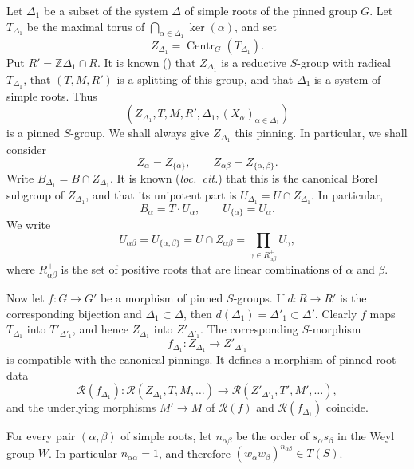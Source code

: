 
Let \(\Delta_1\) be a subset of the system \(\Delta\) of simple roots
of the pinned group \(G\). Let \(T_{\Delta_1}\) be the maximal torus
of \(\bigcap_{\alpha\in\Delta_1}\ker(\alpha)\), and set
\[
  Z_{\Delta_1}=\operatorname{Centr}_G(T_{\Delta_1}).
\]
Put \(R'=\mathbb Z\Delta_1\cap R\). It is known
() that \(Z_{\Delta_1}\) is a reductive \(S\)-group
with radical \(T_{\Delta_1}\), that \((T,M,R')\) is a splitting of
this group, and that \(\Delta_1\) is a system of simple roots. Thus
\[
  (Z_{\Delta_1},T,M,R',\Delta_1,(X_\alpha)_{\alpha\in\Delta_1})
\]
is a pinned \(S\)-group. We shall always give \(Z_{\Delta_1}\) this
pinning. In particular, we shall consider
\[
  Z_\alpha=Z_{\{\alpha\}},\qquad
  Z_{\alpha\beta}=Z_{\{\alpha,\beta\}}.
\]
Write \(B_{\Delta_1}=B\cap Z_{\Delta_1}\). It is known
(\textit{loc.\ cit.}) that this is the canonical Borel subgroup
of \(Z_{\Delta_1}\), and that its unipotent part is
\(U_{\Delta_1}=U\cap Z_{\Delta_1}\). In particular,
\[
  B_\alpha=T\cdot U_\alpha,\qquad U_{\{\alpha\}}=U_\alpha.
\]
We write
\[
  U_{\alpha\beta}=U_{\{\alpha,\beta\}}
  =U\cap Z_{\alpha\beta}
  =\prod_{\gamma\in R_{\alpha\beta}^{+}}U_\gamma,
\]
where \(R_{\alpha\beta}^{+}\) is the set of positive roots that are
linear combinations of \(\alpha\) and \(\beta\).

Now let \(f:G\to G'\) be a morphism of pinned \(S\)-groups. If
\(d:R\to R'\) is the corresponding bijection and
\(\Delta_1\subset\Delta\), then
\(d(\Delta_1)=\Delta'_1\subset\Delta'\). Clearly \(f\) maps
\(T_{\Delta_1}\) into \(T'_{\Delta'_1}\), and hence
\(Z_{\Delta_1}\) into \(Z'_{\Delta'_1}\). The corresponding
\(S\)-morphism
\[
  f_{\Delta_1}:Z_{\Delta_1}\longrightarrow Z'_{\Delta'_1}
\]
is compatible with the canonical pinnings. It defines a morphism of
pinned root data
\[
  \mathscr R(f_{\Delta_1}):
  \mathscr R(Z_{\Delta_1},T,M,\ldots)
  \longrightarrow
  \mathscr R(Z'_{\Delta'_1},T',M',\ldots),
\]
and the underlying morphisms \(M'\to M\) of \(\mathscr R(f)\) and
\(\mathscr R(f_{\Delta_1})\) coincide.


For every pair \((\alpha,\beta)\) of simple roots, let
\(n_{\alpha\beta}\) be the order of \(s_\alpha s_\beta\) in the Weyl
group \(W\). In particular \(n_{\alpha\alpha}=1\), and therefore
\((w_\alpha w_\beta)^{n_{\alpha\beta}}\in T(S)\).

